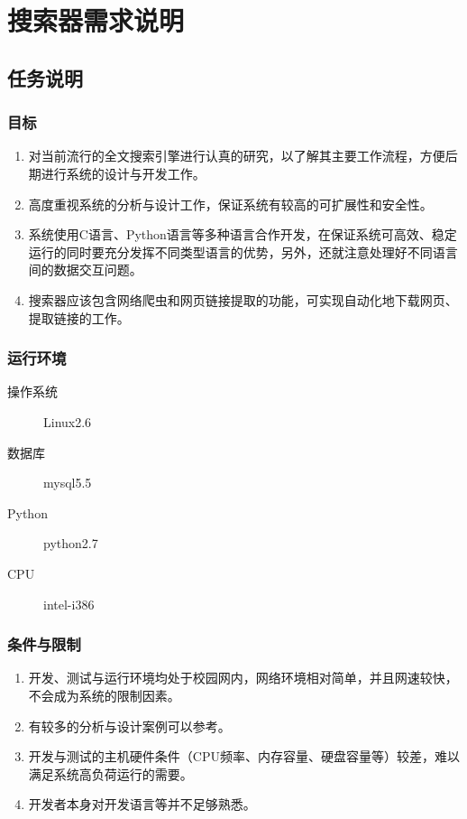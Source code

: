 \chapter{搜索器需求说明}
\section{任务说明}
\subsection{目标}
\begin{enumerate}
\item 对当前流行的全文搜索引擎进行认真的研究，以了解其主要工作流程，方便后期进行系统的设计与开发工作。
\item 高度重视系统的分析与设计工作，保证系统有较高的可扩展性和安全性。
\item 系统使用C语言、Python语言等多种语言合作开发，在保证系统可高效、稳定运行的同时要充分发挥不同类型语言的优势，另外，还就注意处理好不同语言间的数据交互问题。
\item 搜索器应该包含网络爬虫和网页链接提取的功能，可实现自动化地下载网页、提取链接的工作。
\end{enumerate}
\subsection{运行环境}
\begin{description}
\item[操作系统]Linux2.6
\item[数据库]mysql5.5
\item[Python]python2.7
\item[CPU]intel-i386
\end{description}
\subsection{条件与限制}
\begin{enumerate}
\item 开发、测试与运行环境均处于校园网内，网络环境相对简单，并且网速较快，不会成为系统的限制因素。
\item 有较多的分析与设计案例可以参考。
\item 开发与测试的主机硬件条件（CPU频率、内存容量、硬盘容量等）较差，难以满足系统高负荷运行的需要。
\item 开发者本身对开发语言等并不足够熟悉。
\end{enumerate}

